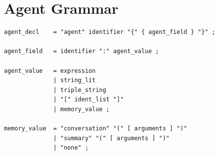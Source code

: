\section{Agent Grammar}

\begin{lstlisting}[language=EBNF]
agent_decl    = "agent" identifier "{" { agent_field } "}" ;

agent_field   = identifier ":" agent_value ;

agent_value   = expression
              | string_lit
              | triple_string
              | "[" ident_list "]"
              | memory_value ;

memory_value  = "conversation" "(" [ arguments ] ")"
              | "summary" "(" [ arguments ] ")"
              | "none" ;
\end{lstlisting}
